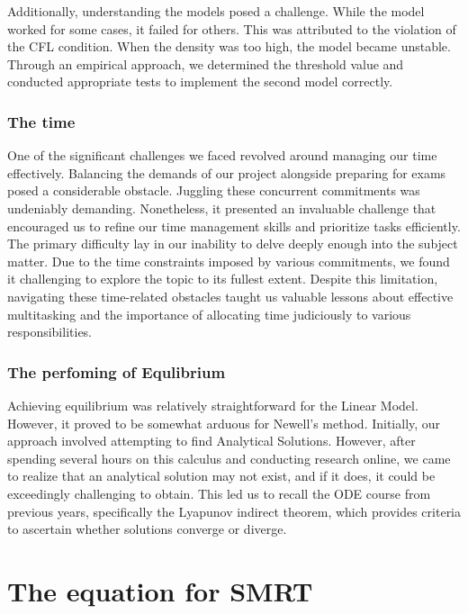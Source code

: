 \documentclass{article}
\begin{document}
		Additionally, understanding the models posed a challenge. While the model worked for some cases, it failed for others. This was attributed to the violation of the CFL condition. When the density was too high, the model became unstable. Through an empirical approach, we determined the threshold value and conducted appropriate tests to implement the second model correctly.
	\subsubsection{The time}
		 One of the significant challenges we faced revolved around managing our time effectively. Balancing the demands of our project alongside preparing for exams posed a considerable obstacle. Juggling these concurrent commitments was undeniably demanding. Nonetheless, it presented an invaluable challenge that encouraged us to refine our time management skills and prioritize tasks efficiently. The primary difficulty lay in our inability to delve deeply enough into the subject matter. Due to the time constraints imposed by various commitments, we found it challenging to explore the topic to its fullest extent. Despite this limitation, navigating these time-related obstacles taught us valuable lessons about effective multitasking and the importance of allocating time judiciously to various responsibilities.
	\subsubsection{The perfoming of Equlibrium}
		Achieving equilibrium was relatively straightforward for the Linear Model. However, it proved to be somewhat arduous for Newell's method. Initially, our approach involved attempting to find Analytical Solutions. However, after spending several hours on this calculus and conducting research online, we came to realize that an analytical solution may not exist, and if it does, it could be exceedingly challenging to obtain. This led us to recall the ODE course from previous years, specifically the Lyapunov indirect theorem, which provides criteria to ascertain whether solutions converge or diverge.
	\section{The equation for SMRT}
\end{document}
